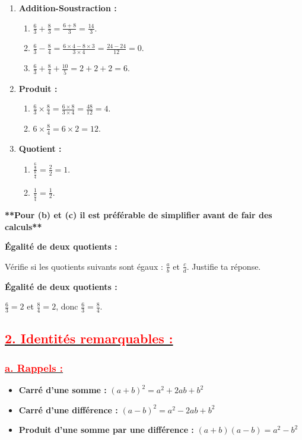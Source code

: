 \documentclass[12pt]{article}
\begin{document}
\begin{enumerate}
    \item \textbf{Addition-Soustraction :}
        \begin{enumerate}
            \item $\frac{6}{3} + \frac{8}{3} = \frac{6 + 8}{3} = \frac{14}{3}$.
            \item $\frac{6}{3} - \frac{8}{4} = \frac{6 \times 4 - 8 \times 3}{3 \times 4} = \frac{24 - 24}{12} = 0$.
            \item $\frac{6}{3} + \frac{8}{4} + \frac{10}{5} = 2 + 2 + 2 = 6$.
        \end{enumerate}
    
    \item \textbf{Produit :}
        \begin{enumerate}
            \item $\frac{6}{3} \times \frac{8}{4} = \frac{6 \times 8}{3 \times 4} = \frac{48}{12} = 4$.
            \item $6 \times \frac{8}{4} = 6 \times 2 = 12$.
        \end{enumerate}
    
    \item \textbf{Quotient :}
        \begin{enumerate}
            \item $\frac{\frac{6}{3}}{\frac{8}{4}} = \frac{2}{2} = 1$.
            \item $\frac{1}{\frac{8}{4}} = \frac{1}{2}$.
        \end{enumerate}
    

\end{enumerate}

\textbf{**Pour (b) et (c) il est préférable de simplifier avant de fair des calculs**}

    \textbf{Égalité de deux quotients :}
    
    Vérifie si les quotients suivants sont égaux : $\frac{a}{b}$ et $\frac{c}{d}$. Justifie ta réponse.
    
 	   \textbf{Égalité de deux quotients :}
    
    $\frac{6}{3} = 2$ et $\frac{8}{4} = 2$, donc $\frac{6}{3} = \frac{8}{4}$.
    
\subsection*{\underline{\textbf{\textcolor{red}{2. Identités remarquables :}}}}
\subsubsection*{\underline{\textbf{\textcolor{red}{a. Rappels :}}}}
\begin{itemize}
    \item \textbf{Carré d'une somme :} \quad $(a + b)^2 = a^2 + 2ab + b^2$
    \item \textbf{Carré d'une différence :} \quad $(a - b)^2 = a^2 - 2ab + b^2$
    \item \textbf{Produit d'une somme par une différence :} \quad $(a + b)(a - b) = a^2 - b^2$
\end{itemize}
\end{document}
